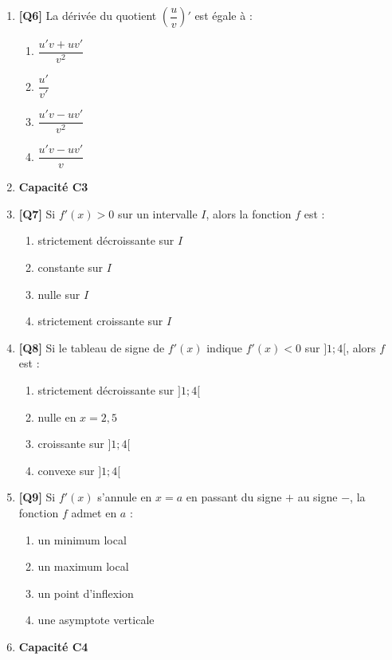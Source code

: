 \begin{enumerate}
\item \textbf{[Q6]} La dérivée du quotient $\left(\dfrac{u}{v}\right)'$ est égale à :
  \begin{enumerate}[label=\Alph*.]
    \item $\dfrac{u'v + uv'}{v^2}$
    \item $\dfrac{u'}{v'}$
    \item $\dfrac{u'v - uv'}{v^2}$
    \item $\dfrac{u'v - uv'}{v}$
  \end{enumerate}

\item[] \textbf{Capacité C3}

\item \textbf{[Q7]} Si $f'(x) > 0$ sur un intervalle $I$, alors la fonction $f$ est :
  \begin{enumerate}[label=\Alph*.]
    \item strictement décroissante sur $I$
    \item constante sur $I$
    \item nulle sur $I$
    \item strictement croissante sur $I$
  \end{enumerate}

\item \textbf{[Q8]} Si le tableau de signe de $f'(x)$ indique $f'(x) < 0$ sur $]1 ; 4[$, alors $f$ est :
  \begin{enumerate}[label=\Alph*.]
    \item strictement décroissante sur $]1 ; 4[$
    \item nulle en $x=2{,}5$
    \item croissante sur $]1 ; 4[$
    \item convexe sur $]1 ; 4[$
  \end{enumerate}

\item \textbf{[Q9]} Si $f'(x)$ s'annule en $x=a$ en passant du signe $+$ au signe $-$, la fonction $f$ admet en $a$ :
  \begin{enumerate}[label=\Alph*.]
    \item un minimum local
    \item un maximum local
    \item un point d'inflexion
    \item une asymptote verticale
  \end{enumerate}

\item[] \textbf{Capacité C4}


\end{enumerate}
